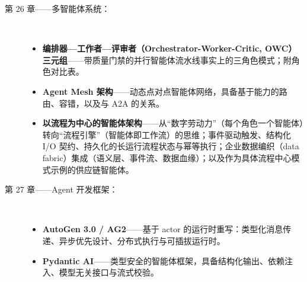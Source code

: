 \documentclass[11pt,a4paper,openany]{book}
\begin{document}
\begin{description}
  \item[第 26 章——多智能体系统：]~
    \begin{itemize}
      \item \textbf{编排器—工作者—评审者（Orchestrator-Worker-Critic, OWC）三元组}——带质量门禁的并行智能体流水线事实上的三角色模式；附角色对比表。
      \item \textbf{Agent Mesh 架构}——动态点对点智能体网络，具备基于能力的路由、容错，以及与 A2A 的关系。
      \item \textbf{以流程为中心的智能体架构}——从“数字劳动力”（每个角色一个智能体）转向“流程引擎”（智能体即工作流）的思维；事件驱动触发、结构化 I/O 契约、持久化的长运行流程状态与幂等执行；企业数据编织（data fabric）集成（语义层、事件流、数据血缘）；以及作为具体流程中心模式示例的供应链智能体。
    \end{itemize}

  \item[第 27 章——Agent 开发框架：]~
    \begin{itemize}
      \item \textbf{AutoGen 3.0 / AG2}——基于 actor 的运行时重写：类型化消息传递、异步优先设计、分布式执行与可插拔运行时。
      \item \textbf{Pydantic AI}——类型安全的智能体框架，具备结构化输出、依赖注入、模型无关接口与流式校验。
    \end{itemize}


\end{description}
\end{document}
